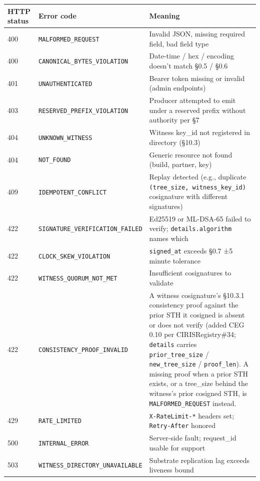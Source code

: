 \documentclass[11pt]{article}
\begin{document}
{\footnotesize
\begin{longtable}{|p{5.33cm}|p{5.33cm}|p{5.33cm}|}\hline
\textbf{HTTP status} & \textbf{Error code} & \textbf{Meaning} \\ \hline\endhead
400 & \texttt{MALFORMED\_REQUEST} & Invalid JSON, missing required field, bad field type \\ \hline
400 & \texttt{CANONICAL\_BYTES\_VIOLATION} & Date-time / hex / encoding doesn't match §0.5 / §0.6 \\ \hline
401 & \texttt{UNAUTHENTICATED} & Bearer token missing or invalid (admin endpoints) \\ \hline
403 & \texttt{RESERVED\_PREFIX\_VIOLATION} & Producer attempted to emit under a reserved prefix without authority per §7 \\ \hline
404 & \texttt{UNKNOWN\_WITNESS} & Witness key\_id not registered in directory (§10.3) \\ \hline
404 & \texttt{NOT\_FOUND} & Generic resource not found (build, partner, key) \\ \hline
409 & \texttt{IDEMPOTENT\_CONFLICT} & Replay detected (e.g., duplicate \texttt{(tree\_size, witness\_key\_id)} cosignature with different signatures) \\ \hline
422 & \texttt{SIGNATURE\_VERIFICATION\_FAILED} & Ed25519 or ML-DSA-65 failed to verify; \texttt{details.algorithm} names which \\ \hline
422 & \texttt{CLOCK\_SKEW\_VIOLATION} & \texttt{signed\_at} exceeds §0.7 ±5 minute tolerance \\ \hline
422 & \texttt{WITNESS\_QUORUM\_NOT\_MET} & Insufficient cosignatures to validate \\ \hline
422 & \texttt{CONSISTENCY\_PROOF\_INVALID} & A witness cosignature's §10.3.1 consistency proof against the prior STH it cosigned is absent or does not verify (added CEG 0.10 per CIRISRegistry\#34; \texttt{details} carries \texttt{prior\_tree\_size} / \texttt{new\_tree\_size} / \texttt{proof\_len}). A missing proof when a prior STH exists, or a tree\_size behind the witness's prior cosigned STH, is \texttt{MALFORMED\_REQUEST} instead. \\ \hline
429 & \texttt{RATE\_LIMITED} & \texttt{X-RateLimit-*} headers set; \texttt{Retry-After} honored \\ \hline
500 & \texttt{INTERNAL\_ERROR} & Server-side fault; request\_id usable for support \\ \hline
503 & \texttt{WITNESS\_DIRECTORY\_UNAVAILABLE} & Substrate replication lag exceeds liveness bound \\ \hline
\end{longtable}}
\end{document}
